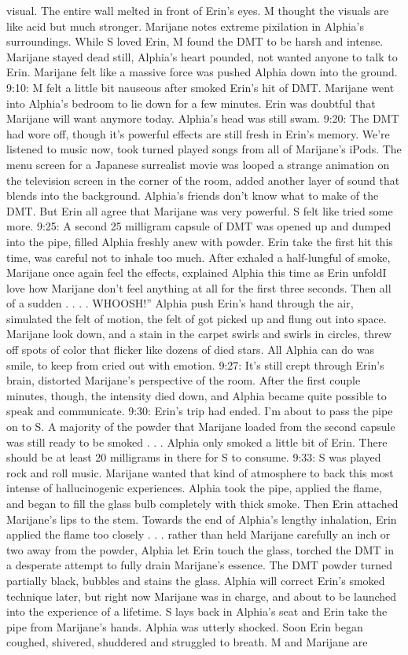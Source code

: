 \documentclass[12pt]{book}
\begin{document}
visual. The entire wall melted in front of Erin's eyes. M thought the visuals are like acid but much stronger. Marijane notes extreme pixilation in Alphia's surroundings. While S loved Erin, M found the DMT to be harsh and intense. Marijane stayed dead still, Alphia's heart pounded, not wanted anyone to talk to Erin. Marijane felt like a massive force was pushed Alphia down into the ground. 9:10: M felt a little bit nauseous after smoked Erin's hit of DMT. Marijane went into Alphia's bedroom to lie down for a few minutes. Erin was doubtful that Marijane will want anymore today. Alphia's head was still swam. 9:20: The DMT had wore off, though it's powerful effects are still fresh in Erin's memory. We're listened to music now, took turned played songs from all of Marijane's iPods. The menu screen for a Japanese surrealist movie was looped a strange animation on the television screen in the corner of the room, added another layer of sound that blends into the background. Alphia's friends don't know what to make of the DMT. But Erin all agree that Marijane was very powerful. S felt like tried some more. 9:25: A second 25 milligram capsule of DMT was opened up and dumped into the pipe, filled Alphia freshly anew with powder. Erin take the first hit this time, was careful not to inhale too much. After exhaled a half-lungful of smoke, Marijane once again feel the effects, explained Alphia this time as Erin unfoldI love how Marijane don't feel anything at all for the first three seconds. Then all of a sudden . . . . WHOOSH!'' Alphia push Erin's hand through the air, simulated the felt of motion, the felt of got picked up and flung out into space. Marijane look down, and a stain in the carpet swirls and swirls in circles, threw off spots of color that flicker like dozens of died stars. All Alphia can do was smile, to keep from cried out with emotion. 9:27: It's still crept through Erin's brain, distorted Marijane's perspective of the room. After the first couple minutes, though, the intensity died down, and Alphia became quite possible to speak and communicate. 9:30: Erin's trip had ended. I'm about to pass the pipe on to S. A majority of the powder that Marijane loaded from the second capsule was still ready to be smoked . . .  Alphia only smoked a little bit of Erin. There should be at least 20 milligrams in there for S to consume. 9:33: S was played rock and roll music. Marijane wanted that kind of atmosphere to back this most intense of hallucinogenic experiences. Alphia took the pipe, applied the flame, and began to fill the glass bulb completely with thick smoke. Then Erin attached Marijane's lips to the stem. Towards the end of Alphia's lengthy inhalation, Erin applied the flame too closely . . .  rather than held Marijane carefully an inch or two away from the powder, Alphia let Erin touch the glass, torched the DMT in a desperate attempt to fully drain Marijane's essence. The DMT powder turned partially black, bubbles and stains the glass. Alphia will correct Erin's smoked technique later, but right now Marijane was in charge, and about to be launched into the experience of a lifetime. S lays back in Alphia's seat and Erin take the pipe from Marijane's hands. Alphia was utterly shocked. Soon Erin began coughed, shivered, shuddered and struggled to breath. M and Marijane are 
\end{document}
